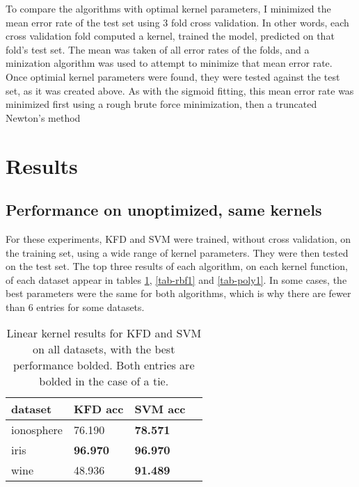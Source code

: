 \documentclass[12pt]{article}
\begin{document}
To compare the algorithms with optimal kernel parameters, I minimized the mean error rate of the test set using 3 fold cross validation.  In other words, each cross validation fold computed a kernel, trained the model, predicted on that fold's test set.  The mean was taken of all error rates of the folds, and a minization algorithm was used to attempt to minimize that mean error rate.  Once optimial kernel parameters were found, they were tested against the test set, as it was created above.  As with the sigmoid fitting, this mean error rate was minimized first using a rough brute force minimization, then a truncated Newton's method \cite{wright, nash}

\section{Results}

\subsection{Performance on unoptimized, same kernels}

For these experiments, KFD and SVM were trained, without cross validation, on the training set, using a wide range of kernel parameters.  They were then tested on the test set.  The top three results of each algorithm, on each kernel function, of each dataset appear in tables \ref{tab-lin1}, \ref{tab-rbf1} and \ref{tab-poly1}.  In some cases, the best parameters were the same for both algorithms, which is why there are fewer than 6 entries for some datasets.

\begin{table}[ht]
\begin{tabular}{l || p{2cm} | p{2cm} |  p{2cm}}
dataset & KFD acc & SVM acc\\
\hline
\hline
ionosphere & 76.190 & \textbf{78.571} \\ 
\hline
iris & \textbf{96.970} & \textbf{96.970} \\ 
\hline
wine & 48.936 & \textbf{91.489} \\ 
\end{tabular}
\caption{Linear kernel results for KFD and SVM on all datasets, with the best performance bolded.  Both entries are bolded in the case of a tie.}
\label{tab-lin1}
\end{table}
\end{document}
